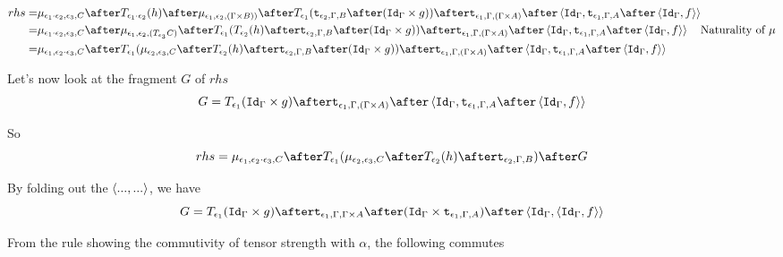 {    \begin{equation}
        \begin{split}
            rhs = &\bind{\e_1\dot\e_2}{\e_3}{C}\after\T{\e_1\dot\e_2}{(h)}\after\bind{\e_1}{\e_2}{(\G \times B))} \after \T{\e_1}{(\tstrength{\e_2}{\G}{B} \after (\idg \times g))} \after \tstrength{\e_1}{\G}{(\G \times A)} \after \pr{\idg}{\tstrength{\e_1}{\G}{A}\after\pr{\idg}{f}}\\
            = &\bind{\e_1\dot\e_2}{\e_3}{C}\after\bind{\e_1}{\e_2}{(\T{\e_3}{C})}\after\T{\e_1}{(\T{\e_2}{(h)} \after \tstrength{\e_2}{\G}{B} \after (\idg \times g))} \after \tstrength{\e_1}{\G}{(\G \times A)} \after \pr{\idg}{\tstrength{\e_1}{\G}{A}\after\pr{\idg}{f}}\qt{Naturality of $\mu$}\\
            = & \bind{\e_1}{\e_2\dot\e_3}{C}\after\T{\e_1}{(\bind{\e_2}{\e_3}{C}\after \T{\e_2}{(h)} \after \tstrength{\e_2}{\G}{B} \after (\idg \times g))} \after \tstrength{\e_1}{\G}{(\G \times A)} \after \pr{\idg}{\tstrength{\e_1}{\G}{A}\after\pr{\idg}{f}}
        \end{split}
    \end{equation}

    Let's now look at the fragment $G$ of $rhs$
    \begin{equation}
        G = \T{\e_1}{(\idg\times g)}\after\tstrength{\e_1}{\G}{(\G\times A)}\after\pr{\idg}{\tstrength{\e_1}{\G}{A}\after\pr{\idg}{f}}
    \end{equation}

    So
    \begin{equation}
        rhs = \bind{\e_1}{\e_2\dot\e_3}{C}\after\T{\e_1}{(\bind{\e_2}{\e_3}{C}\after \T{\e_2}{(h)} \after \tstrength{\e_2}{\G}{B})}\after G
    \end{equation}


    By folding out the $\left\langle..., ...\right\rangle$, we have
    \begin{equation}
        G = \T{\e_1}{(\idg\times g)}\after\tstrength{\e_1}{\G}{\G \times A}\after(\idg\times\tstrength{\e_1}{\G}{A})\after\pr{\idg}{\pr{\idg}{f}}
    \end{equation}

    From the rule  showing the commutivity of tensor strength with $\alpha$, the following commutes


}
